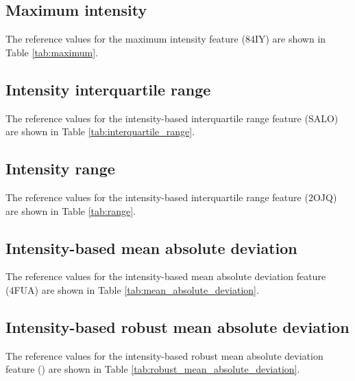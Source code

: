 \documentclass[fleqn,a4paper,oneside,openany]{book}
\newcommand\textid[1]{{\normalsize{\idfont #1}}}
\begin{document}
\subsection{Maximum intensity}
The reference values for the maximum intensity feature (\textid{84IY}) are shown in Table \ref{tab:maximum}.

\subsection{Intensity interquartile range}
The reference values for the intensity-based interquartile range feature (\textid{SALO}) are shown in Table \ref{tab:interquartile_range}.

\begin{minipage}[l]{0.45\textwidth}

\end{minipage}
\quad
\begin{minipage}[r]{0.45\textwidth}

\end{minipage}
\FloatBarrier

\subsection{Intensity range}
The reference values for the intensity-based interquartile range feature (\textid{2OJQ}) are shown in Table \ref{tab:range}.

\subsection{Intensity-based mean absolute deviation}
The reference values for the intensity-based mean absolute deviation feature (\textid{4FUA}) are shown in Table \ref{tab:mean_absolute_deviation}.

\begin{minipage}[l]{0.45\textwidth}

\end{minipage}
\quad
\begin{minipage}[r]{0.45\textwidth}

\end{minipage}
\FloatBarrier

\subsection{Intensity-based robust mean absolute deviation}
The reference values for the intensity-based robust mean absolute deviation feature (\textid{1128}) are shown in Table \ref{tab:robust_mean_absolute_deviation}.
\end{document}
